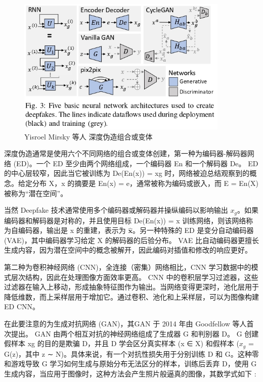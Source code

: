 \begin{figure}[htb]
\centering 
\includegraphics[width=0.90\textwidth]{img/ch4m4.png} 
\caption{ Yisroel Mirsky 等人 \cite{DBLP:journals/corr/abs-2004-11138} 深度伪造组合或变体}
\label{Test}
\end{figure}

深度伪造通常是使用六个不同网络的组合或变体创建，第一种为编码器-解码器网络 (ED)。一个 ED 至少由两个网络组成，一个编码器 En 和一个解码器 De。 ED 的中心层较窄，因此当它被训练为 De(En(x)) = xg 时，网络被迫总结观察到的概念。给定分布 X，x 的摘要是 En(x) = e，通常被称为编码或嵌入，而 E = En(X) 被称为“潜在空间”。

当然 Deepfake 技术通常使用多个编码器或解码器并操纵编码以影响输出 $x_g$。如果编码器和解码器是对称的，并且使用目标 De(En(x)) = x 训练网络，则该网络称为自编码器，输出是 x 的重建，表示为 $\hat{\boldsymbol{x}}$。另一种特殊的 ED 是变分自动编码器 (VAE)，其中编码器学习给定 X 的解码器的后验分布。 VAE 比自动编码器更擅长生成内容，因为潜在空间中的概念被解开，因此编码对插值和修改的响应更好。

第二种为卷积神经网络 (CNN)，全连接（密集）网络相比，CNN 学习数据中的模式层次结构，因此在处理图像方面效率更高。 CNN 中的卷积层学习过滤器，这些过滤器在输入上移动，形成抽象特征图作为输出。当网络变得更深时，池化层用于降低维数，而上采样层用于增加它。通过卷积、池化和上采样层，可以为图像构建 ED CNN。

在此要注意的为生成对抗网络 (GAN)，其GAN 于 2014 年由 Goodfellow 等人首次提出。 GAN 由两个相互对抗的神经网络组成了生成器 G 和判别器 D。 G 创建假样本 xg 的目的是欺骗 D，并且 D 学会区分真实样本 (x ∈ X) 和假样本 ($x_g$ = G(z)，其中 z ∼ N)。具体来说，有一个对抗性损失用于分别训练 D 和 G。这种零和游戏导致 G 学习如何生成与原始分布无法区分的样本，训练后丢弃 D，使用 G 生成内容，当应用于图像时，这种方法会产生照片般逼真的图像，其数学式如下 :

